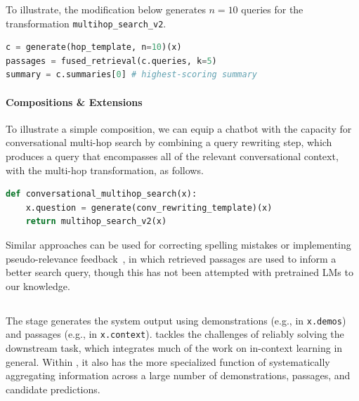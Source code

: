 To illustrate, the modification below generates $n=10$ queries for the transformation \texttt{multihop\_search\_v2}.

\begin{samepage}
\begin{lstlisting}[numbers=none,language=Python,breaklines=true]
c = generate(hop_template, n=10)(x)
passages = fused_retrieval(c.queries, k=5)
summary = c.summaries[0] # highest-scoring summary
\end{lstlisting}
\end{samepage}

\paragraph{Compositions \& Extensions} To illustrate a simple composition, we can equip a chatbot with the capacity for conversational multi-hop search by combining a query rewriting step, which produces a query that encompasses all of the relevant conversational context, with the multi-hop transformation, as follows.

\begin{samepage}
\begin{lstlisting}[language=Python,breaklines=true]
def conversational_multihop_search(x):
    x.question = generate(conv_rewriting_template)(x)
    return multihop_search_v2(x)
\end{lstlisting}
\end{samepage}

Similar approaches can be used for correcting spelling mistakes or implementing pseudo-relevance feedback~\cite{cao2008selecting,wang2022colbert}, in which retrieved passages are used to inform a better search query, though this has not been attempted with pretrained LMs to our knowledge.







\subsection{\predict}
\label{sec:dsp:predict}

The \predict stage generates the system output using demonstrations (e.g., in \texttt{x.demos}) and passages (e.g., in \texttt{x.context}). \predict tackles the challenges of reliably solving the downstream task, which integrates much of the work on in-context learning in general. Within \DSP, it also has the more specialized function of systematically aggregating information across a large number of demonstrations, passages, and candidate predictions.

